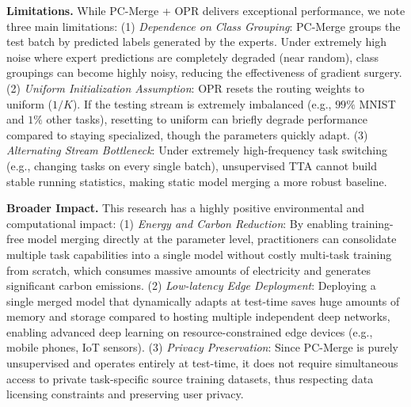 \documentclass{article}
\theoremstyle{plain}
\theoremstyle{definition}
\theoremstyle{remark}
\begin{document}
\textbf{Limitations.} While PC-Merge + OPR delivers exceptional performance, we note three main limitations: (1) \emph{Dependence on Class Grouping}: PC-Merge groups the test batch by predicted labels generated by the experts. Under extremely high noise where expert predictions are completely degraded (near random), class groupings can become highly noisy, reducing the effectiveness of gradient surgery. (2) \emph{Uniform Initialization Assumption}: OPR resets the routing weights to uniform ($1/K$). If the testing stream is extremely imbalanced (e.g., $99\%$ MNIST and $1\%$ other tasks), resetting to uniform can briefly degrade performance compared to staying specialized, though the parameters quickly adapt. (3) \emph{Alternating Stream Bottleneck}: Under extremely high-frequency task switching (e.g., changing tasks on every single batch), unsupervised TTA cannot build stable running statistics, making static model merging a more robust baseline.

\textbf{Broader Impact.} This research has a highly positive environmental and computational impact: (1) \emph{Energy and Carbon Reduction}: By enabling training-free model merging directly at the parameter level, practitioners can consolidate multiple task capabilities into a single model without costly multi-task training from scratch, which consumes massive amounts of electricity and generates significant carbon emissions. (2) \emph{Low-latency Edge Deployment}: Deploying a single merged model that dynamically adapts at test-time saves huge amounts of memory and storage compared to hosting multiple independent deep networks, enabling advanced deep learning on resource-constrained edge devices (e.g., mobile phones, IoT sensors). (3) \emph{Privacy Preservation}: Since PC-Merge is purely unsupervised and operates entirely at test-time, it does not require simultaneous access to private task-specific source training datasets, thus respecting data licensing constraints and preserving user privacy.
\end{document}
